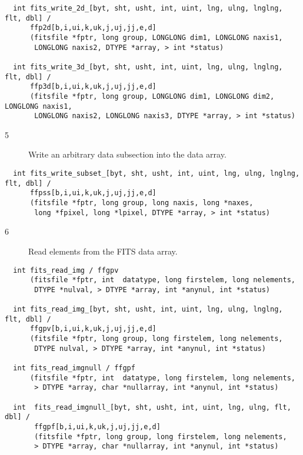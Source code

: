 \documentclass[11pt]{book}
\begin{document}
\begin{verbatim}
  int fits_write_2d_[byt, sht, usht, int, uint, lng, ulng, lnglng, flt, dbl] /
      ffp2d[b,i,ui,k,uk,j,uj,jj,e,d]
      (fitsfile *fptr, long group, LONGLONG dim1, LONGLONG naxis1,
       LONGLONG naxis2, DTYPE *array, > int *status)

  int fits_write_3d_[byt, sht, usht, int, uint, lng, ulng, lnglng, flt, dbl] /
      ffp3d[b,i,ui,k,uk,j,uj,jj,e,d]
      (fitsfile *fptr, long group, LONGLONG dim1, LONGLONG dim2, LONGLONG naxis1,
       LONGLONG naxis2, LONGLONG naxis3, DTYPE *array, > int *status)
\end{verbatim}

\begin{description}
\item[5 ]  Write an arbitrary data subsection into the data array. \label{ffpssx}
\end{description}

\begin{verbatim}
  int fits_write_subset_[byt, sht, usht, int, uint, lng, ulng, lnglng, flt, dbl] /
      ffpss[b,i,ui,k,uk,j,uj,jj,e,d]
      (fitsfile *fptr, long group, long naxis, long *naxes,
       long *fpixel, long *lpixel, DTYPE *array, > int *status)
\end{verbatim}

\begin{description}
\item[6 ] Read elements from the FITS data array.
    \label{ffgpv} \label{ffgpvx} \label{ffgpf} \label{ffgpfx}
\end{description}

\begin{verbatim}
  int fits_read_img / ffgpv
      (fitsfile *fptr, int  datatype, long firstelem, long nelements,
       DTYPE *nulval, > DTYPE *array, int *anynul, int *status)

  int fits_read_img_[byt, sht, usht, int, uint, lng, ulng, lnglng, flt, dbl] /
      ffgpv[b,i,ui,k,uk,j,uj,jj,e,d]
      (fitsfile *fptr, long group, long firstelem, long nelements,
       DTYPE nulval, > DTYPE *array, int *anynul, int *status)

  int fits_read_imgnull / ffgpf
      (fitsfile *fptr, int  datatype, long firstelem, long nelements,
       > DTYPE *array, char *nullarray, int *anynul, int *status)

  int  fits_read_imgnull_[byt, sht, usht, int, uint, lng, ulng, flt, dbl] /
       ffgpf[b,i,ui,k,uk,j,uj,jj,e,d]
       (fitsfile *fptr, long group, long firstelem, long nelements,
       > DTYPE *array, char *nullarray, int *anynul, int *status)
\end{verbatim}
\end{document}
